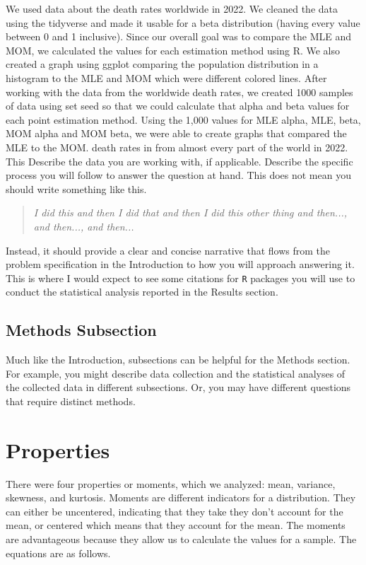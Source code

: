 \documentclass{article}\usepackage[]{graphicx}\usepackage[]{xcolor}
\begin{document}
\begin{multicols}{2}
We used data about the death rates worldwide in 2022. We cleaned the data using the tidyverse \citep{tidyverse} 
and made it usable for a beta distribution (having every value between 0 and 1 inclusive). 
Since our overall goal was to compare the MLE and MOM, we calculated the values for each estimation  
method using R. We also created a graph using ggplot \citep{ggplot2} comparing the population distribution in a histogram to the MLE and 
MOM which were different colored lines.
After working with the data from the worldwide death rates, we created 1000 samples of data using set seed 
so that we could calculate that alpha and beta values for each point estimation method. Using the 1,000 
values for MLE alpha, MLE, beta, MOM alpha and MOM beta, we were able to create graphs that compared the MLE 
to the MOM.
death rates in from almost every part of the world in 2022. This 
Describe the data you are working with, if applicable. Describe the specific process you will follow to answer the question at hand. This does not mean you should write something like this.
\begin{quote}
\textit{I did this and then I did that and then I did this other thing and then..., and then..., and then...}
\end{quote}
Instead, it should provide a clear and concise narrative that flows from the problem specification in the Introduction to how you will approach answering it. This is where I would expect to see some citations for \texttt{R} packages you will use to conduct the statistical analysis reported in the Results section.


\subsection{Methods Subsection}
Much like the Introduction, subsections can be helpful for the Methods section. For example, you might describe data collection and the statistical analyses of the collected data in different subsections. Or, you may have different questions that require distinct methods. 

\section{Properties}
There were four properties or moments, which we analyzed: mean, variance, skewness, and kurtosis. Moments are different indicators for a distribution. They can either be uncentered, indicating that they take they don't account for the mean, or centered which means that they account for the mean. The moments are advantageous because they allow us to calculate the values for a sample. The equations are as follows. 



\end{multicols}
\end{document}
